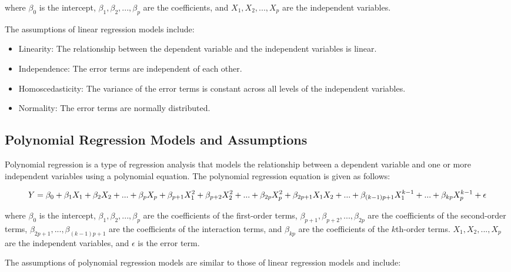 \documentclass{article}
\begin{document}
where $\beta_0$ is the intercept, $\beta_1, \beta_2, ..., \beta_p$ are the coefficients, and $X_1, X_2, ..., X_p$ are the independent variables.

The assumptions of linear regression models include:

\begin{itemize}
\item Linearity: The relationship between the dependent variable and the independent variables is linear.
\item Independence: The error terms are independent of each other.
\item Homoscedasticity: The variance of the error terms is constant across all levels of the independent variables.
\item Normality: The error terms are normally distributed.
\end{itemize}

\subsection{Polynomial Regression Models and Assumptions}
Polynomial regression is a type of regression analysis that models the relationship between a dependent variable and one or more independent variables using a polynomial equation. The polynomial regression equation is given as follows:

\begin{equation}
    Y = \beta_0 + \beta_1X_1 + \beta_2X_2 + ... + \beta_pX_p \\
    + \beta_{p+1}X_1^2 + \beta_{p+2}X_2^2 + ... + \beta_{2p}X_p^2 \\
    + \beta_{2p+1}X_1X_2 + ... + \beta_{(k-1)p+1}X_1^{k-1} + ... \\
    + \beta_{kp}X_p^{k-1} + \epsilon
    \end{equation}
    
    

where $\beta_0$ is the intercept, $\beta_1, \beta_2, ..., \beta_p$ are the coefficients of the first-order terms, $\beta_{p+1}, \beta_{p+2}, ..., \beta_{2p}$ are the coefficients of the second-order terms, $\beta_{2p+1}, ..., \beta_{(k-1)p+1}$ are the coefficients of the interaction terms, and $\beta_{kp}$ are the coefficients of the $k$th-order terms. $X_1, X_2, ..., X_p$ are the independent variables, and $\epsilon$ is the error term.

The assumptions of polynomial regression models are similar to those of linear regression models and include:
\end{document}
